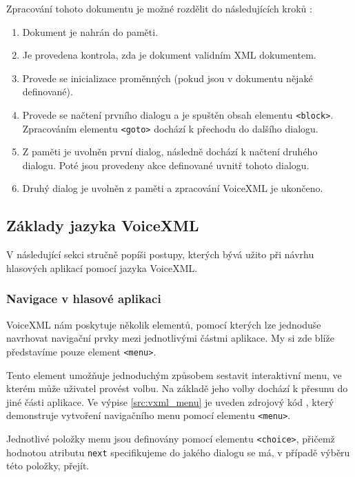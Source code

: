 \documentclass[ing,male,java,dept460]{diploma}						%
\begin{document}
Zpracování tohoto dokumentu je možné rozdělit do následujících kroků \cite{vxmldevguide}:

\begin{enumerate}
\item Dokument je nahrán do paměti.
\item Je provedena kontrola, zda je dokument validním XML dokumentem.
\item Provede se inicializace proměnných (pokud jsou v dokumentu nějaké definované).
\item Provede se načtení prvního dialogu a je spuštěn obsah elementu \texttt{<block>}. Zpracováním elementu \texttt{<goto>} dochází k přechodu do dalšího dialogu.
\item Z paměti je uvolněn první dialog, následně dochází k načtení druhého dialogu. Poté jsou provedeny akce definované uvnitř tohoto dialogu.
\item Druhý dialog je uvolněn z paměti a zpracování VoiceXML je ukončeno.
\end{enumerate}

\subsection{Základy jazyka VoiceXML}
V následující sekci stručně popíši postupy, kterých bývá užito při návrhu hlasových aplikací pomocí jazyka VoiceXML.

\subsubsection{Navigace v hlasové aplikaci}
VoiceXML nám poskytuje několik elementů, pomocí kterých lze jednoduše navrhovat navigační prvky mezi jednotlivými částmi aplikace. My si zde blíže představíme pouze element \texttt{<menu>}.

Tento element umožňuje jednoduchým způsobem sestavit interaktivní menu, ve kterém může uživatel provést volbu. Na základě jeho volby dochází k přesunu do jiné části aplikace. Ve výpise \ref{src:vxml_menu} je uveden zdrojový kód \cite{vxml_org}, který demonstruje vytvoření navigačního menu pomocí elementu \texttt{<menu>}.



Jednotlivé položky menu jsou definovány pomocí elementu \texttt{<choice>}, přičemž hodnotou atributu \texttt{next} specifikujeme do jakého dialogu se má, v případě výběru této položky, přejít.
\end{document}
